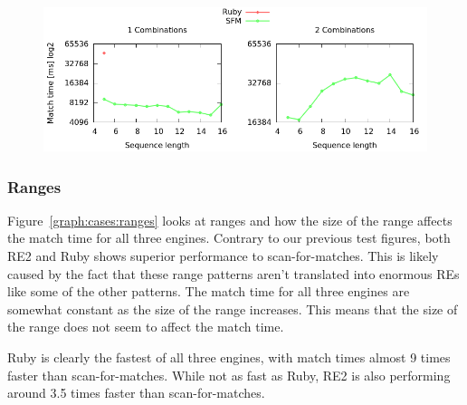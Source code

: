 \documentclass[12pt]{article}
\theoremstyle{definition}
\begin{document}
\begin{figure}[H]
	\begin{center}
		\includegraphics[scale=0.55]{graphs/combinations.png}	
	\end{center}
	\caption{}
	\label{graph:cases:combinations}
\end{figure}

\newpage
\subsubsection{Ranges}

Figure~\ref{graph:cases:ranges} looks at ranges and how the size of the range affects the match time for all three engines. Contrary to our previous test figures, both RE2 and Ruby shows superior performance to scan-for-matches. This is likely caused by the fact that these range patterns aren't translated into enormous REs like some of the other patterns. The match time for all three engines are somewhat constant as the size of the range increases. This means that the size of the range does not seem to affect the match time.

Ruby is clearly the fastest of all three engines, with match times almost 9 times faster than scan-for-matches. While not as fast as Ruby, RE2 is also performing around 3.5 times faster than scan-for-matches.
\end{document}
